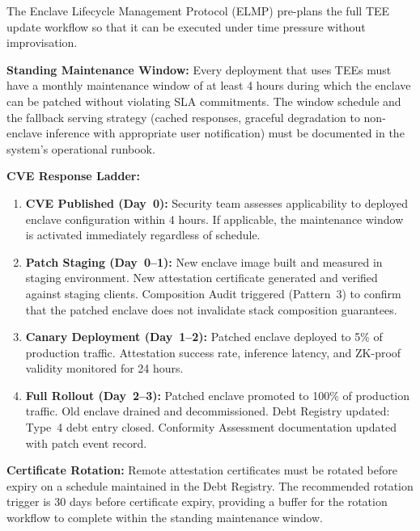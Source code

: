 \begin{tcolorbox}[debtpattern,
  title={Debt Management Pattern 4 --- Enclave Lifecycle
         Management Protocol}]

The Enclave Lifecycle Management Protocol (ELMP) pre-plans
the full TEE update workflow so that it can be executed
under time pressure without improvisation.

\textbf{Standing Maintenance Window:}
Every deployment that uses TEEs must have a monthly
maintenance window of at least 4 hours during which the
enclave can be patched without violating SLA commitments.
The window schedule and the fallback serving strategy (cached
responses, graceful degradation to non-enclave inference
with appropriate user notification) must be documented in
the system's operational runbook.

\textbf{CVE Response Ladder:}
\begin{enumerate}
  \item \textbf{CVE Published (Day~0):}
    Security team assesses applicability to deployed
    enclave configuration within 4 hours.
    If applicable, the maintenance window is activated
    immediately regardless of schedule.

  \item \textbf{Patch Staging (Day~0--1):}
    New enclave image built and measured in staging
    environment.
    New attestation certificate generated and verified
    against staging clients.
    Composition Audit triggered (Pattern~3) to confirm
    that the patched enclave does not invalidate stack
    composition guarantees.

  \item \textbf{Canary Deployment (Day~1--2):}
    Patched enclave deployed to 5\% of production traffic.
    Attestation success rate, inference latency, and
    ZK-proof validity monitored for 24 hours.

  \item \textbf{Full Rollout (Day~2--3):}
    Patched enclave promoted to 100\% of production traffic.
    Old enclave drained and decommissioned.
    Debt Registry updated: Type~4 debt entry closed.
    Conformity Assessment documentation updated with
    patch event record.
\end{enumerate}

\textbf{Certificate Rotation:}
Remote attestation certificates must be rotated before
expiry on a schedule maintained in the Debt Registry.
The recommended rotation trigger is 30 days before
certificate expiry, providing a buffer for the rotation
workflow to complete within the standing maintenance window.
\end{tcolorbox}

